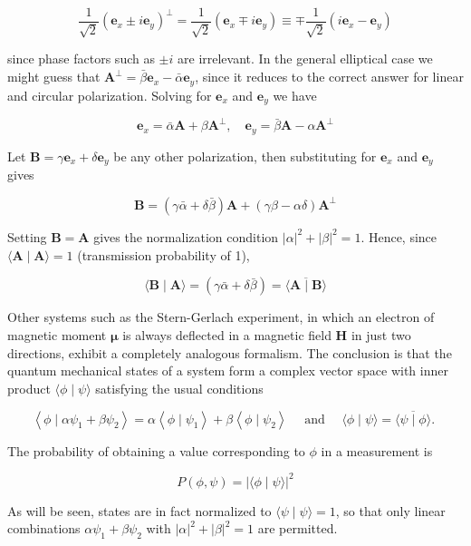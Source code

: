 \documentclass[hyperref,UTF8]{ctexbook}
\begin{document}
$$
\frac{1}{\sqrt{2}}\left(\mathbf{e}_{x} \pm i \mathbf{e}_{y}\right)^{\perp}=\frac{1}{\sqrt{2}}\left(\mathbf{e}_{x} \mp i \mathbf{e}_{y}\right) \equiv \mp \frac{1}{\sqrt{2}}\left(i \mathbf{e}_{x}-\mathbf{e}_{y}\right)
$$

since phase factors such as $\pm i$ are irrelevant. In the general elliptical case we might guess that $\mathbf{A}^{\perp}=\bar{\beta} \mathbf{e}_{x}-\bar{\alpha} \mathbf{e}_{y}$, since it reduces to the correct answer for linear and circular polarization. Solving for $\mathbf{e}_{x}$ and $\mathbf{e}_{y}$ we have

$$
\mathbf{e}_{x}=\bar{\alpha} \mathbf{A}+\beta \mathbf{A}^{\perp}, \quad \mathbf{e}_{y}=\bar{\beta} \mathbf{A}-\alpha \mathbf{A}^{\perp}
$$

Let $\mathbf{B}=\gamma \mathbf{e}_{x}+\delta \mathbf{e}_{y}$ be any other polarization, then substituting for $\mathbf{e}_{x}$ and $\mathbf{e}_{y}$ gives

$$
\mathbf{B}=(\gamma \bar{\alpha}+\delta \bar{\beta}) \mathbf{A}+(\gamma \beta-\alpha \delta) \mathbf{A}^{\perp}
$$

Setting $\mathbf{B}=\mathbf{A}$ gives the normalization condition $|\alpha|^{2}+|\beta|^{2}=1$. Hence, since $\langle\mathbf{A} \mid \mathbf{A}\rangle=1$ (transmission probability of 1),

$$
\langle\mathbf{B} \mid \mathbf{A}\rangle=(\gamma \bar{\alpha}+\delta \bar{\beta})=\overline{\langle\mathbf{A} \mid \mathbf{B}\rangle}
$$

Other systems such as the Stern-Gerlach experiment, in which an electron of magnetic moment $\boldsymbol{\mu}$ is always deflected in a magnetic field $\mathbf{H}$ in just two directions, exhibit a completely analogous formalism. The conclusion is that the quantum mechanical states of a system form a complex vector space with inner product $\langle\phi \mid \psi\rangle$ satisfying the usual conditions

$$
\left\langle\phi \mid \alpha \psi_{1}+\beta \psi_{2}\right\rangle=\alpha\left\langle\phi \mid \psi_{1}\right\rangle+\beta\left\langle\phi \mid \psi_{2}\right\rangle \quad \text { and } \quad\langle\phi \mid \psi\rangle=\overline{\langle\psi \mid \phi\rangle} \text {. }
$$

The probability of obtaining a value corresponding to $\phi$ in a measurement is

$$
P(\phi, \psi)=|\langle\phi \mid \psi\rangle|^{2}
$$

As will be seen, states are in fact normalized to $\langle\psi \mid \psi\rangle=1$, so that only linear combinations $\alpha \psi_{1}+\beta \psi_{2}$ with $|\alpha|^{2}+|\beta|^{2}=1$ are permitted.
\end{document}
